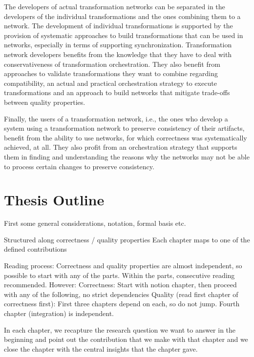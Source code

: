 The developers of actual transformation networks can be separated in the developers of the individual transformations and the ones combining them to a network.
The development of individual transformations is supported by the provision of systematic approaches to build transformations that can be used in networks, especially in terms of supporting synchronization.
Transformation network developers benefits from the knowledge that they have to deal with conservativeness of transformation orchestration.
They also benefit from approaches to validate transformations they want to combine regarding compatibility, an actual and practical orchestration strategy to execute transformations and an approach to build networks that mitigate trade-offs between quality properties.

Finally, the users of a transformation network, i.e., the ones who develop a system using a transformation network to preserve consistency of their artifacts, benefit from the ability to use networks, for which correctness was systematically achieved, at all.
They also profit from an orchestration strategy that supports them in finding and understanding the reasons why the networks may not be able to process certain changes to preserve consistency.



\section{Thesis Outline}


First some general considerations, notation, formal basis etc.

Structured along correctness / quality properties
Each chapter maps to one of the defined contributions

Reading process: Correctness and quality properties are almost independent, so possible to start with any of the parts. Within the parts, consecutive reading recommended.
However:
Correctness: Start with notion chapter, then proceed with any of the following, no strict dependencies
Quality (read first chapter of correctness first): First three chapters depend on each, so do not jump. Fourth chapter (integration) is independent.

In each chapter, we recapture the research question we want to answer in the beginning and point out the contribution that we make with that chapter and we close the chapter with the central insights that the chapter gave.


